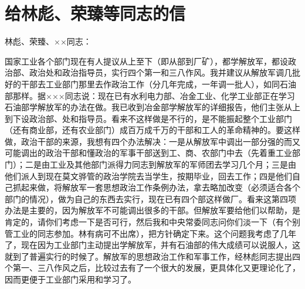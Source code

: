 \section[给林彪、荣臻等同志的信（一九六三年十一月十六日）]{给林彪、荣臻等同志的信}


林彪、荣臻、××同志：

国家工业各个部门现在有人提议从上至下（即从部到厂矿），都学解放军，都设政治部、政治处和政治指导员，实行四个第一和三八作风。我并建议从解放军调几批好的干部去工业部门那里去作政治工作（分几年完成，一年调一批人），如同石油部那样。据×××同志说：现在已有水利电力部、冶金工业、化学工业部正在学习石油部学解放军的办法在做。我已收到冶金部学解放军的详细报告，他们主张从上到下设政治部、处和指导员。看来不这样做是不行的，是不能振起整个工业部门（还有商业部，还有农业部门）成百万成千万的干部和工人的革命精神的。要这样做，政治干部的来源，我想有四个办法解决：一是从解放军中调出一部分强的而又可能调出的政治干部和懂政治的军事干部送到工、商、农部门中去（先着重工业部门）；二是由工业及其他部门派得力同志到解放军的军师团去学习几个月；三是由他们派人到现在莫文骅管的政治学院去当学生，按期毕业，回去工作；四是他们自己抓起来做，将解放军一套思想政治工作条例办法，拿去略加改变（必须适合各个部门的情况），做为自己的东西去实行，现在已有四个部这样做厂。看来这第四项办法是主要的，因为解放军不可能调出很多的干部。但解放军要给他们以帮助，是肯定的，请你们考虑一下是否可行，然后我和中央常委同志问你们淡一下（有个别管工业的同志参加。林有病可不出席），把方针确定下来。这个问题我考虑了几年了，现在因为工业部门主动提出学解放军，并有石油部的伟大成绩可以说服人，这就到了普遍实行的时候了。解放军的思想政治工作和军事工作，经林彪同志提出四个第一、三八作风之后，比较过去有了一个很大的发展，更具体化又更理论化了，因而更便于工业部门采用和学习了。

